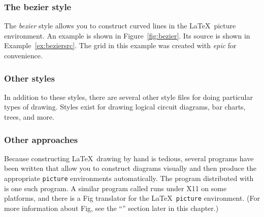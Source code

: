 

\subsubsection{The bezier style}

The \textit{bezier} style allows you 
to construct curved lines in the 
\LaTeX\ picture environment.  An example is shown in 
Figure~\ref{fig:bezier}.  Its source is shown in Example~\ref{ex:beziersrc}.
The grid in this example was created with \textit{epic} for convenience.



\subsubsection{Other styles}

In addition to these styles, there are several other style files
for doing particular types of drawing.  Styles exist for drawing logical
circuit diagrams, bar charts, trees, and more.

\subsubsection{Other approaches}

Because constructing \LaTeX\ drawing by hand is tedious, several programs 
have been written that allow you to construct diagrams visually
and then produce the appropriate \verb|picture| environments
automatically.  The  program distributed 
with 
is one such program.  A similar program called  runs
under X11 on some platforms, and there is a Fig translator for the
\LaTeX\ \verb|picture| environment. (For more information about Fig,
see the ``'' section later in this chapter.)

\subsection{\protect\PiCTeX}

